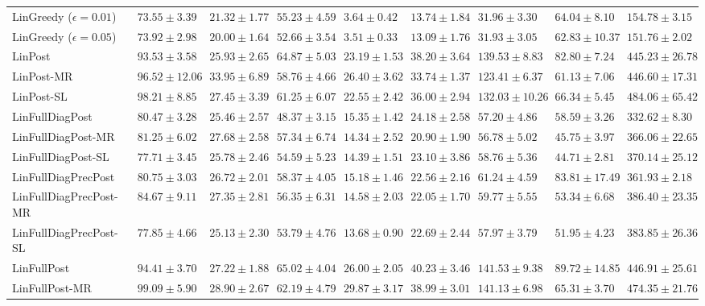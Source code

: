 \documentclass{article} \usepackage{iclr2018_conference,times}
\begin{document}
\begin{landscape}
\begin{table}[ht]
\begin{adjustbox}{center}
\begin{tabular}{lllllllll}
LinGreedy ($\epsilon =0.01$) & $73.55 \pm 3.39$& $21.32 \pm 1.77$& $55.23 \pm 4.59$& $3.64 \pm 0.42$& $13.74 \pm 1.84$& $31.96 \pm 3.30$& $64.04 \pm 8.10$& $154.78 \pm 3.15$ \\
LinGreedy ($\epsilon =0.05$) & $73.92 \pm 2.98$& $20.00 \pm 1.64$& $52.66 \pm 3.54$& $3.51 \pm 0.33$& $13.09 \pm 1.76$& $31.93 \pm 3.05$& $62.83 \pm 10.37$& $151.76 \pm 2.02$ \\
LinPost & $93.53 \pm 3.58$& $25.93 \pm 2.65$& $64.87 \pm 5.03$& $23.19 \pm 1.53$& $38.20 \pm 3.64$& $139.53 \pm 8.83$& $82.80 \pm 7.24$& $445.23 \pm 26.78$ \\
LinPost-MR & $96.52 \pm 12.06$& $33.95 \pm 6.89$& $58.76 \pm 4.66$& $26.40 \pm 3.62$& $33.74 \pm 1.37$& $123.41 \pm 6.37$& $61.13 \pm 7.06$& $446.60 \pm 17.31$ \\
LinPost-SL & $98.21 \pm 8.85$& $27.45 \pm 3.39$& $61.25 \pm 6.07$& $22.55 \pm 2.42$& $36.00 \pm 2.94$& $132.03 \pm 10.26$& $66.34 \pm 5.45$& $484.06 \pm 65.42$ \\
LinFullDiagPost & $80.47 \pm 3.28$& $25.46 \pm 2.57$& $48.37 \pm 3.15$& $15.35 \pm 1.42$& $24.18 \pm 2.58$& $57.20 \pm 4.86$& $58.59 \pm 3.26$& $332.62 \pm 8.30$ \\
LinFullDiagPost-MR & $81.25 \pm 6.02$& $27.68 \pm 2.58$& $57.34 \pm 6.74$& $14.34 \pm 2.52$& $20.90 \pm 1.90$& $56.78 \pm 5.02$& $45.75 \pm 3.97$& $366.06 \pm 22.65$ \\
LinFullDiagPost-SL & $77.71 \pm 3.45$& $25.78 \pm 2.46$& $54.59 \pm 5.23$& $14.39 \pm 1.51$& $23.10 \pm 3.86$& $58.76 \pm 5.36$& $44.71 \pm 2.81$& $370.14 \pm 25.12$ \\
LinFullDiagPrecPost & $80.75 \pm 3.03$& $26.72 \pm 2.01$& $58.37 \pm 4.05$& $15.18 \pm 1.46$& $22.56 \pm 2.16$& $61.24 \pm 4.59$& $83.81 \pm 17.49$& $361.93 \pm 2.18$ \\
LinFullDiagPrecPost-MR & $84.67 \pm 9.11$& $27.35 \pm 2.81$& $56.35 \pm 6.31$& $14.58 \pm 2.03$& $22.05 \pm 1.70$& $59.77 \pm 5.55$& $53.34 \pm 6.68$& $386.40 \pm 23.35$ \\
LinFullDiagPrecPost-SL & $77.85 \pm 4.66$& $25.13 \pm 2.30$& $53.79 \pm 4.76$& $13.68 \pm 0.90$& $22.69 \pm 2.44$& $57.97 \pm 3.79$& $51.95 \pm 4.23$& $383.85 \pm 26.36$ \\
LinFullPost & $94.41 \pm 3.70$& $27.22 \pm 1.88$& $65.02 \pm 4.04$& $26.00 \pm 2.05$& $40.23 \pm 3.46$& $141.53 \pm 9.38$& $89.72 \pm 14.85$& $446.91 \pm 25.61$ \\
LinFullPost-MR & $99.09 \pm 5.90$& $28.90 \pm 2.67$& $62.19 \pm 4.79$& $29.87 \pm 3.17$& $38.99 \pm 3.01$& $141.13 \pm 6.98$& $65.31 \pm 3.70$& $474.35 \pm 21.76$ \\

\end{tabular}
\end{adjustbox}
\end{table}
\end{landscape}
\end{document}
